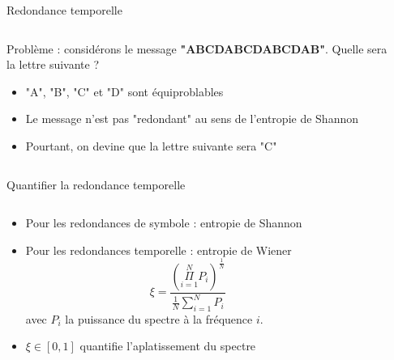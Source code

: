 \documentclass[9pt, aspectratio=169]{beamer}
\begin{document}
\begin{frame}{Redondance temporelle} %

\begin{columns}
   \begin{column}{0.6\textwidth}

        Problème : considérons le message \textbf{"ABCDABCDABCDAB"}. Quelle sera la lettre suivante ?
        \begin{itemize}
            \item "A", "B", "C" et "D" sont équiproblables
            \item Le message n'est pas "redondant" au sens de l'entropie de Shannon
            \item Pourtant, on devine que la lettre suivante sera "C"
        
        \end{itemize}
        
   \end{column}
   \begin{column}{0.39\textwidth}
		
   \end{column}
\end{columns}
\end{frame}


\begin{frame}{Quantifier la redondance temporelle} %

\begin{columns}
   \begin{column}{0.6\textwidth}


        \begin{itemize}
            \item Pour les redondances de symbole : entropie de Shannon
            \item Pour les redondances temporelle : entropie de Wiener
            \begin{equation*}
            	\xi = \frac{\left(\Pi\limits_{i=1}^N P_i \right)^\frac{1}{N}}{\frac{1}{N}\sum\limits_{i=1}^N P_i}
            \end{equation*}
            avec $P_i$ la puissance du spectre à la fréquence $i$.
            \item $\xi \in [0, 1]$ quantifie l'aplatissement du spectre
        
        \end{itemize}
        
   \end{column}
   \begin{column}{0.39\textwidth}
		
   \end{column}
\end{columns}
\end{frame}
\end{document}
